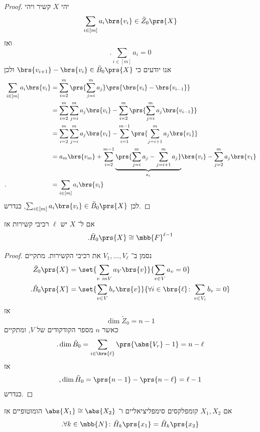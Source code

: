 \documentclass[a4paper,10pt,twoside,openany]{book}
\begin{document}
\begin{proof}
יהי
$X$
קשיר ויהי
\[\sum_{i \in [m]} a_i \brs{v_i} \in \tilde{Z}_0\prs{X}\]
ואז
\[\text{.} \sum_{i \in [m]} a_i = 0\]
אנו יודעים כי
$\brs{v_{i+1}} - \brs{v_i} \in \tilde{B}_0\prs{X}$
ולכן
\begin{align*}
\sum_{i \in [m]} a_i \brs{v_i} &= \sum_{i=2}^m \prs{\sum_{j = i}^m a_j} \prs{\brs{v_i} - \brs{v_{i-1}}}
\\&=
\sum_{i=2}^m \sum_{j=i}^m a_j \brs{v_i} - \sum_{i = 2}^m \prs{\sum_{j=i}^m a_j \brs{v_{i-1}}}
\\&=
\sum_{i=2}^m \sum_{j=i}^m a_j \brs{v_i} - \sum_{i = 1}^{m-1} \prs{\sum_{j=i+1}^m a_j \brs{v_{i}}}
\\&=
a_m \brs{v_m} + \sum_{i=2}^{m-1} \underset{a_i}{\underbrace{\prs{\sum_{j=i}^m a_j - \sum_{j=i+1}^m a_j}}} \brs{v_i} - \sum_{j=2}^m a_j \brs{v_1}
\\ \text{.} \hphantom{\sum_{i \in [m]} a_i \brs{v_i}} &=
\sum_{i \in [m]} a_i \brs{v_i}
\end{align*}
לכן
$\sum_{i \in [m]} a_i \brs{v_i} \in \tilde{B}_0\prs{X}$,
כנדרש.
\end{proof}

\begin{proposition}
אם ל־%
$X$
יש
$\ell$
רכיבי קשירות אז
\[\text{.} \tilde{H}_0\prs{X} \cong \mbb{F}^{\ell-1}\]
\end{proposition}

\begin{proof}
נסמן ב־%
$V_1, \ldots, V_\ell$
את רכיבי הקשירות. מתקיים
\begin{align*}
\tilde{Z}_0\prs{X} &= \set{\sum_{v \ in V} a_V \brs{v}}{\sum_{v \in V} a_v = 0} \\
\text{.} \tilde{B}_0\prs{X} &= \set{\sum_{v \in V} b_v\brs{v}}{\forall i \in \brs{\ell} \colon \sum_{v \in V_i} b_v = 0}
\end{align*}
אז
\[\dim \tilde{Z}_0 = n-1\]
כאשר
$n$
מספר הקודקודים של
$V$,
ומתקיים
\[\text{.}\dim \tilde{B}_0 = \sum_{i \in \brs{\ell}} \prs{\abs{V_r} - 1} = n-\ell\]
אז
\[\text{,} \dim \tilde{H}_0 = \prs{n-1} - \prs{n-\ell} = \ell - 1\]
כנדרש.
\end{proof}


\begin{theorem}
אם
$X_1, X_2$
קומפלקסים סימפליציאליים ו־%
$\abs{X_1} \cong \abs{X_2}$
הומוטופיים אז
\[\text{.} \forall k \in \mbb{N} \colon \tilde{H}_k\prs{x_1} = \tilde{H}_k\prs{x_2}\]
\end{theorem}
\end{document}
